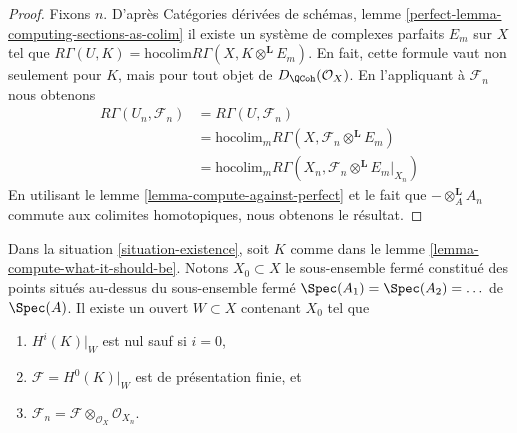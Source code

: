 \begin{proof}
Fixons $n$. D'après Catégories dérivées de schémas, lemme
\ref{perfect-lemma-computing-sections-as-colim}
il existe un système de complexes parfaits $E_m$
sur $X$ tel que\newline
$R\Gamma(U, K) = \text{hocolim} R\Gamma(X, K \otimes^\mathbf{L} E_m)$.
En fait, cette formule vaut non seulement pour $K$, mais pour tout objet de
$D_\QCoh(\mathcal{O}_X)$.
En l'appliquant à $\mathcal{F}_n$
nous obtenons
\begin{align*}
R\Gamma(U_n, \mathcal{F}_n)
& =
R\Gamma(U, \mathcal{F}_n) \\
& =
\text{hocolim}_m R\Gamma(X, \mathcal{F}_n \otimes^\mathbf{L} E_m) \\
& =
\text{hocolim}_m R\Gamma(X_n, \mathcal{F}_n \otimes^\mathbf{L} E_m|_{X_n})
\end{align*}
En utilisant le lemme \ref{lemma-compute-against-perfect}
et le fait que $- \otimes_A^\mathbf{L} A_n$
commute aux colimites homotopiques, nous obtenons le résultat.
\end{proof}

\begin{lemma}
\label{lemma-finitely-presented}
Dans la situation \ref{situation-existence}, soit $K$ comme dans le
lemme \ref{lemma-compute-what-it-should-be}.
Notons $X_0 \subset X$ le sous-ensemble fermé
constitué des points situés au-dessus du sous-ensemble fermé
$\Spec(A_1) = \Spec(A_2) = \ldots$ de $\Spec(A)$.
Il existe un ouvert $W \subset X$ contenant $X_0$
tel que
\begin{enumerate}
\item $H^i(K)|_W$ est nul sauf si $i = 0$,
\item $\mathcal{F} = H^0(K)|_W$ est de présentation finie, et
\item $\mathcal{F}_n = \mathcal{F} \otimes_{\mathcal{O}_X} \mathcal{O}_{X_n}$.
\end{enumerate}
\end{lemma}

